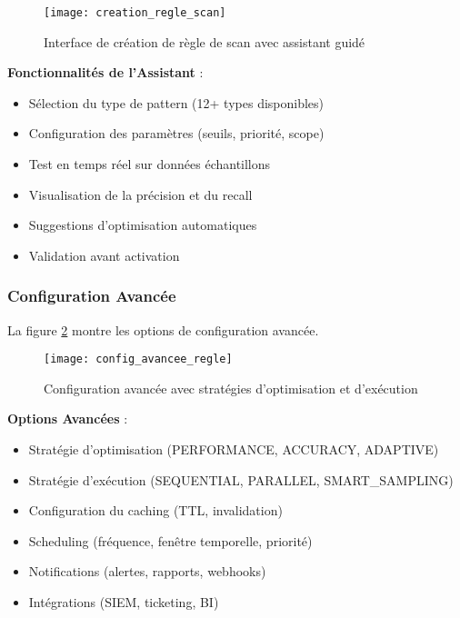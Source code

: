 \begin{figure}[htpb]
\centering
\texttt{[image: creation\_regle\_scan]}
\caption{Interface de création de règle de scan avec assistant guidé}
\label{fig:creation_regle_scan}
\end{figure}

\textbf{Fonctionnalités de l'Assistant} :
\begin{itemize}
    \item Sélection du type de pattern (12+ types disponibles)
    \item Configuration des paramètres (seuils, priorité, scope)
    \item Test en temps réel sur données échantillons
    \item Visualisation de la précision et du recall
    \item Suggestions d'optimisation automatiques
    \item Validation avant activation
\end{itemize}

\subsubsection{Configuration Avancée}

La figure \ref{fig:config_avancee_regle} montre les options de configuration avancée.

\begin{figure}[htpb]
\centering
\texttt{[image: config\_avancee\_regle]}
\caption{Configuration avancée avec stratégies d'optimisation et d'exécution}
\label{fig:config_avancee_regle}
\end{figure}

\textbf{Options Avancées} :
\begin{itemize}
    \item Stratégie d'optimisation (PERFORMANCE, ACCURACY, ADAPTIVE)
    \item Stratégie d'exécution (SEQUENTIAL, PARALLEL, SMART\_SAMPLING)
    \item Configuration du caching (TTL, invalidation)
    \item Scheduling (fréquence, fenêtre temporelle, priorité)
    \item Notifications (alertes, rapports, webhooks)
    \item Intégrations (SIEM, ticketing, BI)
\end{itemize}

